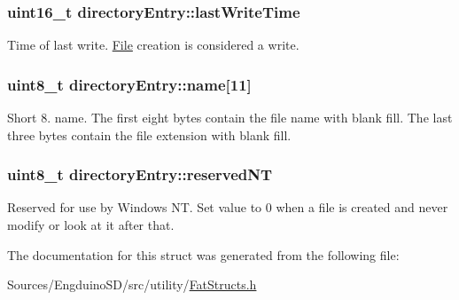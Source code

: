 \subsubsection[{last\+Write\+Time}]{\setlength{\rightskip}{0pt plus 5cm}uint16\+\_\+t directory\+Entry\+::last\+Write\+Time}\label{structdirectory_entry_a7bab435322d1928f66fbce53ee1f402d}
Time of last write. \hyperlink{class_file}{File} creation is considered a write. \hypertarget{structdirectory_entry_a05dc993ea55a1a742de5970541a31ecb}{}
\subsubsection[{name}]{\setlength{\rightskip}{0pt plus 5cm}uint8\+\_\+t directory\+Entry\+::name\mbox{[}11\mbox{]}}\label{structdirectory_entry_a05dc993ea55a1a742de5970541a31ecb}
Short 8. name. The first eight bytes contain the file name with blank fill. The last three bytes contain the file extension with blank fill. \hypertarget{structdirectory_entry_afe7d00be85f3b78549b21610050da52b}{}
\subsubsection[{reserved\+N\+T}]{\setlength{\rightskip}{0pt plus 5cm}uint8\+\_\+t directory\+Entry\+::reserved\+N\+T}\label{structdirectory_entry_afe7d00be85f3b78549b21610050da52b}
Reserved for use by Windows N\+T. Set value to 0 when a file is created and never modify or look at it after that. 

The documentation for this struct was generated from the following file\+:\begin{DoxyCompactItemize}
\item 
Sources/\+Engduino\+S\+D/src/utility/\hyperlink{_fat_structs_8h}{Fat\+Structs.\+h}\end{DoxyCompactItemize}
